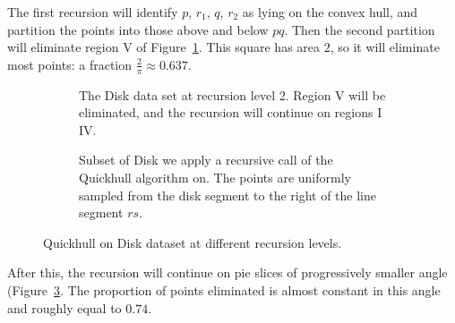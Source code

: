 The first recursion will identify $p$, $r_1$, $q$, $r_2$ as lying on the
convex hull, and partition the points into those above and below $pq$.
Then the second partition will eliminate region V of 
Figure~\ref{fig:disk_level2}. This square has area $2$, so it will eliminate
most points: a fraction $\frac{2}{\pi} \approx 0.637$.

\begin{figure}[ht]
    \begin{subfigure}{0.4\textwidth}
        \caption{The Disk data set at recursion level 2. Region V will be 
                 eliminated, and the recursion will continue on regions I 
                 \textemdash IV.}
        \label{fig:disk_level2}
    \end{subfigure}
    \hfill
    \begin{subfigure}{0.4\textwidth}
        \caption{Subset of Disk we apply a recursive call of the Quickhull 
                 algorithm on. The points are uniformly sampled from the disk
                 segment to the right of the line segment $rs$.}
        \label{fig:disk_level3+}
    \end{subfigure}
    \caption{Quickhull on Disk dataset at different recursion levels.}
\end{figure}

After this, the recursion will continue on pie slices of progressively smaller
angle (Figure~\ref{fig:disk_level3+}. 
The proportion of points eliminated is almost constant in this angle and roughly
equal to $0.74$.

